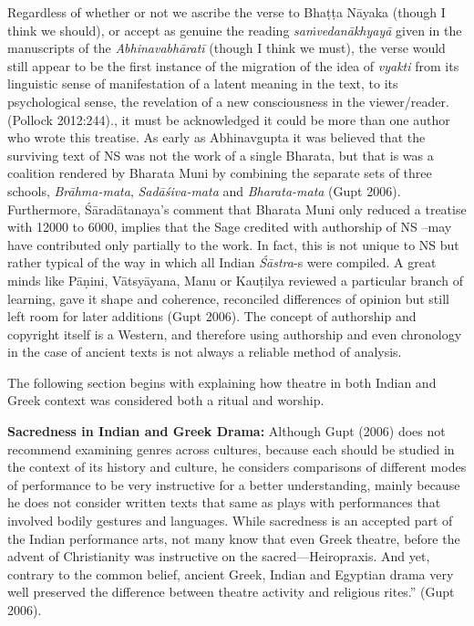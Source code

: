 {Regardless of whether or not we ascribe the verse to Bhaṭṭa Nāyaka (though I think we should), or accept as genuine the reading \textsl{saṁvedanākhyayā} given in the manuscripts of the \textsl{Abhinavabhāratī} (though I think we must), the verse would still appear to be the first instance of the migration of the idea of \textsl{vyakti} from its linguistic sense of manifestation of a latent meaning in the text, to its psychological sense, the revelation of a new consciousness in the viewer/reader. (Pollock 2012:244).}, it must be acknowledged it could be more than one author who wrote this treatise. As early as Abhinavgupta it was believed that the surviving text of NS was not the work of a single Bharata, but that is was a coalition rendered by Bharata Muni by combining the separate sets of three schools, \textsl{Brāhma-mata}, \textsl{Sadāśiva-mata} and \textsl{Bharata-mata} (Gupt 2006). Furthermore, Śāradātanaya’s comment that Bharata Muni only reduced a treatise with 12000 to 6000, implies that the Sage credited with authorship of NS –may have contributed only partially to the work. In fact, this is not unique to NS but rather typical of the way in which all Indian \textsl{Śāstra}-s were compiled. A great minds like Pāṇini, Vātsyāyana, Manu or Kauṭilya reviewed a particular branch of learning, gave it shape and coherence, reconciled differences of opinion but still left room for later additions (Gupt 2006). The concept of authorship and copyright itself is a Western, and therefore using authorship and even chronology in the case of ancient texts is not always a reliable method of analysis. 


The following section begins with explaining how theatre in both Indian and Greek context was considered both a ritual and worship. 

\textbf{Sacredness in Indian and Greek Drama:} Although Gupt (2006) does not recommend examining genres across cultures, because each should be studied in the context of its history and culture, he considers comparisons of different modes of performance to be very instructive for a better understanding, mainly because he does not consider written texts that same as plays with performances that involved bodily gestures and languages. While sacredness is an accepted part of the Indian performance arts, not many know that even Greek theatre, before the advent of Christianity was instructive on the sacred---Heiropraxis. And yet, contrary to the common belief, ancient Greek, Indian and Egyptian drama very well preserved the difference between theatre activity and religious rites.” (Gupt 2006).

